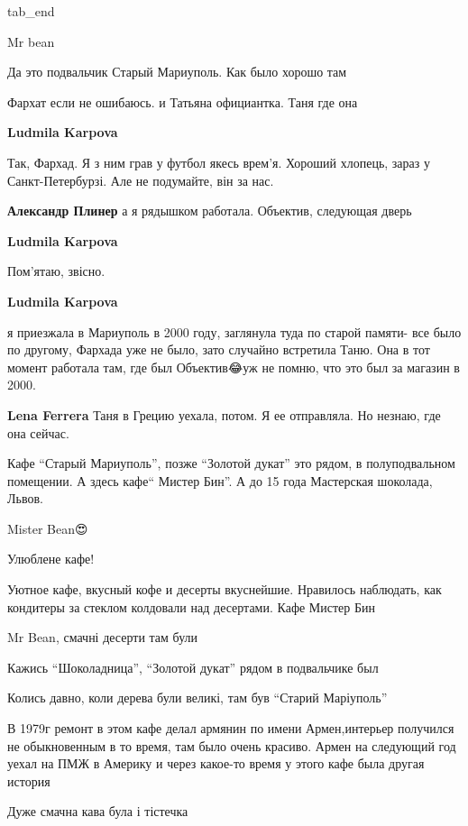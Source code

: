 	tab_end
\fi


Mr bean


Да это подвальчик Старый Мариуполь. Как было хорошо там

Фархат если не ошибаюсь. и Татьяна официантка. Таня где она

\begin{itemize} %
\textbf{Ludmila Karpova}

Так, Фархад. Я з ним грав у футбол якесь врем'я. Хороший хлопець, зараз у
Санкт-Петербурзі. Але не подумайте, він за нас.

\textbf{Александр Плинер} а я рядышком работала. Объектив, следующая дверь

\textbf{Ludmila Karpova}

Пом'ятаю, звісно.

\textbf{Ludmila Karpova} 

я приезжала в Мариуполь в 2000 году, заглянула туда по старой памяти- все было
по другому, Фархада уже не было, зато случайно встретила Таню. Она в тот момент
работала там, где был Объектив😂уж не помню, что это был за магазин в 2000.

\textbf{Lena Ferrera} Таня в Грецию уехала, потом. Я ее отправляла. Но незнаю, где она сейчас.

\end{itemize} %


Кафе \enquote{Старый Мариуполь}, позже \enquote{Золотой дукат} это рядом, в полуподвальном
помещении. А здесь кафе\enquote{ Мистер Бин}. А до 15 года Мастерская шоколада, Львов.


Mister Bean😍


Улюблене кафе!


Уютное кафе, вкусный кофе и десерты вкуснейшие. Нравилось наблюдать, как
кондитеры за стеклом колдовали над десертами. Кафе Мистер Бин


Mr Bean, смачні десерти там були


Кажись \enquote{Шоколадница}, \enquote{Золотой дукат} рядом в подвальчике был


Колись давно, коли дерева були великі, там був \enquote{Старий Маріуполь}


В 1979г ремонт в этом кафе делал армянин по имени Армен,интерьер получился не
обыкновенным в то время, там было очень красиво. Армен на следующий год уехал
на ПМЖ в Америку и через какое-то время у этого кафе была другая история


Дуже смачна кава була і тістечка
